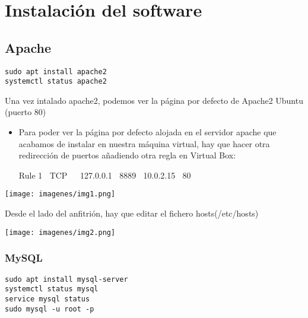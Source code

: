 \documentclass{article}
\begin{document}
\section{Instalación del software}
\subsection{Apache}


\lstset{language=C, breaklines=true, basicstyle=\footnotesize}
\begin{lstlisting}[frame=single]
sudo apt install apache2
systemctl status apache2
\end{lstlisting}

\begin{flushleft}
Una vez intalado apache2, podemos ver la página por defecto de Apache2 Ubuntu (puerto 80)
\begin{itemize}
\item Para poder ver la página por defecto alojada en el servidor apache que acabamos de instalar en nuestra máquina
virtual, hay que hacer otra redirección de puertos añadiendo otra regla en Virtual Box:
\begin{center}
Rule 1$\ \ \ \ $TCP $\ \ \ \ $ 127.0.0.1$\ \ \ \ $8889$\ \ \ \ $10.0.2.15$\ \ \ \ $80\\
\end{center}
\end{itemize}
\end{flushleft}


\begin{center}
\texttt{[image: imagenes/img1.png]} 

\end{center}
\newpage
\begin{flushleft}
Desde el lado del anfitrión, hay que editar el fichero hosts(/etc/hosts)
\end{flushleft}

\begin{center}
\texttt{[image: imagenes/img2.png]} 

\end{center}


\subsubsection{MySQL}



\lstset{language=C, breaklines=true, basicstyle=\footnotesize}
\begin{lstlisting}[frame=single]
sudo apt install mysql-server
systemctl status mysql
service mysql status 
sudo mysql -u root -p
\end{lstlisting}
\end{document}

